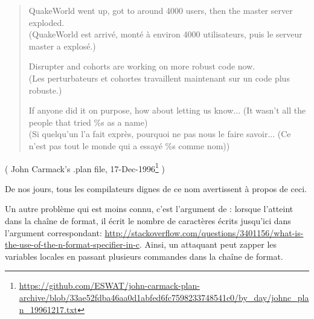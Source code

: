 \begin{framed}
\begin{quotation}
QuakeWorld went up, got to around 4000 users, then the master server exploded.\\
(QuakeWorld est arrivé, monté à environ 4000 utilisateurs, puis le serveur master a explosé.)

Disrupter and cohorts are working on more robust code now.\\
(Les perturbateurs et cohortes travaillent maintenant sur un code plus robuste.)

If anyone did it on purpose, how about letting us know... (It wasn't all the people that tried \%s as a name)\\
(Si quelqu'un l'a fait exprès, pourquoi ne pas nous le faire savoir... (Ce n'est pas tout le monde qui a essayé \%s comme nom))
\end{quotation}
\end{framed}
( John Carmack's .plan file, 17-Dec-1996\footnote{\url{https://github.com/ESWAT/john-carmack-plan-archive/blob/33ae52fdba46aa0d1abfed6fc7598233748541c0/by_day/johnc_plan_19961217.txt}} )

De nos jours, tous les compilateurs dignes de ce nom avertissent à propos de ceci.

Un autre problème qui est moins connu, c'est l'argument  de \printf: lorsque
\printf l'atteint dans la chaîne de format, il écrit le nombre de caractères écrits
jusqu'ici dans l'argument correspondant:
\url{http://stackoverflow.com/questions/3401156/what-is-the-use-of-the-n-format-specifier-in-c}.
Ainsi, un attaquant peut zapper les variables locales en passant plusieurs commandes
 dans la chaîne de format.
